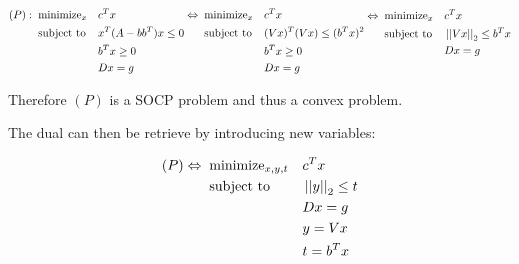 \documentclass{article}
\begin{document}
\begin{equation*}
    \begin{aligned}
        (P):\;\; & \text{minimize}_x &  & c^Tx                 \\
                 & \text{subject to} &  & x^T(A - bb^T)x \le 0 \\
                 &                   &  & b^Tx \ge 0           \\
                 &                   &  & Dx = g               \\
    \end{aligned}
    \;
    \begin{aligned}
        \Leftrightarrow\;\; & \text{minimize}_x &  & c^Tx                    \\
                            & \text{subject to} &  & (Vx)^T(Vx) \le (b^Tx)^2 \\
                            &                   &  & b^Tx \ge 0              \\
                            &                   &  & Dx = g                  \\
    \end{aligned}
    \;
    \begin{aligned}
        \Leftrightarrow\;\; & \text{minimize}_x &  & c^Tx                 \\
                            & \text{subject to} &  & \left|\left| Vx \right|\right|_2 \le b^Tx \\
                            &                   &  & Dx = g               \\
                            &                   &  &                      \\
    \end{aligned}
\end{equation*}


Therefore $(P)$ is a SOCP problem and thus a convex problem.

The dual can then be retrieve by introducing new variables:

\begin{equation*}
    \begin{aligned}
        (P)\Leftrightarrow\;\; & \text{minimize}_{x,y,t} &  & c^Tx             \\
                               & \text{subject to}       &  & \left|\left| y \right|\right|_2 \le t \\
                               &                         &  & Dx = g           \\
                               &                         &  & y = Vx           \\
                               &                         &  & t = b^Tx         \\
    \end{aligned}
\end{equation*}
\end{document}
